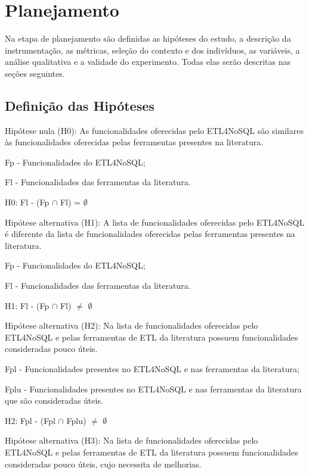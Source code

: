 \section{Planejamento}

Na etapa de planejamento são definidas as hipóteses do estudo, a descrição da instrumentação, as métricas, seleção do contexto e dos indivíduos, as variáveis, a análise qualitativa e a validade do experimento. Todas elas serão descritas nas seções seguintes.

\subsection{Definição das Hipóteses}

Hipótese nula (H0): As funcionalidades oferecidas pelo ETL4NoSQL são similares às funcionalidades oferecidas pelas ferramentas presentes na literatura.

Fp - Funcionalidades do ETL4NoSQL;

Fl - Funcionalidades das ferramentas da literatura.

H0: Fl - (Fp $\cap$ Fl) = $\emptyset$
\newline

Hipótese alternativa (H1): A lista de funcionalidades oferecidas pelo ETL4NoSQL é diferente da lista de funcionalidades oferecidas pelas ferramentas presentes na literatura.

Fp - Funcionalidades do ETL4NoSQL;

Fl - Funcionalidades das ferramentas da literatura.

H1: Fl - (Fp $\cap$ Fl) $\neq$ $\emptyset$
\newline

Hipótese alternativa (H2): Na lista de funcionalidades oferecidas pelo ETL4NoSQL e pelas ferramentas de ETL da literatura possuem funcionalidades consideradas pouco úteis.

Fpl - Funcionalidades presentes no ETL4NoSQL e nas ferramentas da literatura;

Fplu - Funcionalidades presentes no ETL4NoSQL e nas ferramentas da literatura que são consideradas úteis.

H2: Fpl - (Fpl $\cap$ Fplu) $\neq$ $\emptyset$
\newline


Hipótese alternativa (H3): Na lista de funcionalidades oferecidas pelo ETL4NoSQL e pelas ferramentas de ETL da literatura possuem funcionalidades consideradas pouco úteis, cujo necessita de melhorias.

